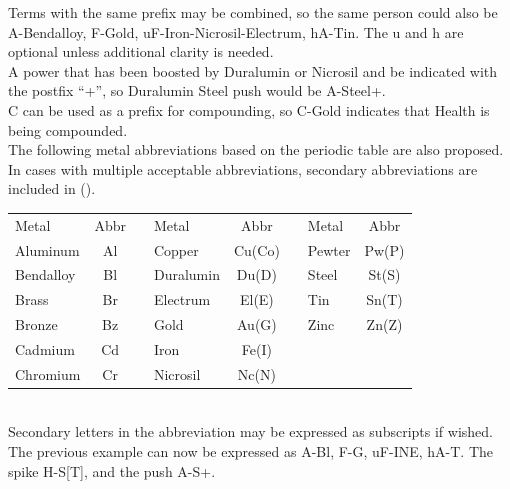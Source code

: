 \documentclass[conference]{IEEEtran}
\newcommand{\n}{\hfill\break}
\begin{document}
Terms with the same prefix may be combined, so the same person could also be A-Bendalloy, F-Gold, uF-Iron-Nicrosil-Electrum, hA-Tin.  
The u and h are optional unless additional clarity is needed.\\

A power that has been boosted by Duralumin or Nicrosil and be indicated with the postfix ``+'', so Duralumin Steel push would be A-Steel+. \\

C can be used as a prefix for compounding, so C-Gold indicates that Health is being compounded.\\

The following metal abbreviations based on the periodic table are also proposed.  In cases with multiple acceptable abbreviations, secondary abbreviations are included in ().\\\n
\setlength{\tabcolsep}{.5\tabcolsep}
\begin{tabular}{|l |c |c|l |c |c|l |c | }
	
	\cline{1-2}\cline{4-5}\cline{7-8}
	Metal&Abbr&&Metal&Abbr&&Metal&Abbr\\
	\cline{1-2}\cline{4-5}\cline{7-8}
	
	\cline{1-2}\cline{4-5}\cline{7-8}
	Aluminum & Al&&  Copper & Cu(Co) && 	Pewter & Pw(P) \\ 
	\cline{1-2}\cline{4-5}\cline{7-8}
	Bendalloy & Bl && Duralumin &Du(D) &&  	Steel & St(S)\\
	\cline{1-2}\cline{4-5}\cline{7-8}
	Brass & Br && Electrum& El(E) &&  Tin & Sn(T)\\
	\cline{1-2}\cline{4-5}\cline{7-8}
	Bronze & Bz &&	Gold&Au(G)  &&Zinc & Zn(Z)  \\
	\cline{1-2}\cline{4-5}\cline{7-8}
Cadmium & Cd&&	Iron & Fe(I)  \\
	\cline{1-2}\cline{4-5}
	Chromium &Cr&& Nicrosil & Nc(N) \\
	\cline{1-2}\cline{4-5}
\end{tabular}\\

Secondary letters in the abbreviation may be expressed as subscripts if wished.
The previous example can now be expressed as A-Bl, F-G, uF-INE, hA-T.  The spike H-S[T], and the push A-S+.\\
\end{document}
